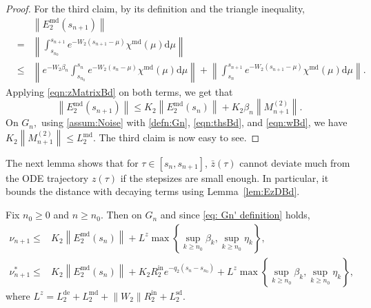 \documentclass[usenames,dvipsnames,final,12pt]{colt2018} %
\newcommand{\Ww}{W_2}
\newcommand{\Mw}{M^{(2)}}
\newcommand{\sw}{\beta}
\newcommand{\lz}{q_2}
\newcommand{\Rzi}{R_2^{\textrm{in}}}
\newcommand{\rz}{\nu}
\newcommand{\rzS}{\nu^{*}}
\newcommand{\chizM}{\chi^{\md}}
\newcommand{\barz}{\bar{z}}
\newcommand{\Ez}{E_2}
\newcommand{\Lz}{L^z}
\newcommand{\LzD}{L_2^{\dt}}
\newcommand{\LzM}{L_2^{\md}}
\newcommand{\LzS}{L_2^{\sd}}
\newcommand{\Kz}{K_2}
\newcommand{\EzM}{\Ez^{\md}}
\newcommand{\dt}{\text{de}}
\newcommand{\md}{\text{md}}
\newcommand{\sd}{\text{sd}}
\newcommand{\df}{\mathrm{d}}
\newcommand{\sI}[1]{s_{#1}}
\newcommand{\norm}[1]{\left\lVert#1\right\rVert}
\newcommand{\gal}[1]{#1}
\begin{document}
\begin{proof}
For the third claim, by its definition and the triangle inequality,
%
\begin{eqnarray*}
& & \norm{\EzM(\sI{n + 1})}\\
& = &  \norm{\int_{s_{n_0} }^{\sI{n + 1}} e^{-\Ww (\sI{n + 1} - \mu)} \chizM(\mu)\df \mu}\\
& \leq & \norm{e^{-\Ww \beta_n} \int_{ s_{n_0}}^{\sI{n}} e^{-\Ww (\sI{n} - \mu)} \chizM(\mu)\df \mu} + \norm{\int_{\sI{n}}^{\sI{n + 1}} e^{-\Ww (\sI{n + 1} - \mu)} \chizM(\mu)\df \mu}.
\end{eqnarray*}
%
Applying \eqref{eqn:zMatrixBd} on both terms, we get that
%
\[
\norm{\EzM(\sI{n + 1})} \leq \Kz \norm{\EzM(\sI{n})} + \Kz \sw_n \norm{\Mw_{n + 1}}.
\]
%
On $G_n,$ using \ref{assum:Noise} with \eqref{defn:Gn}, \eqref{eqn:thsBd}, and \eqref{eqn:wBd}, we have $\Kz\norm{\Mw_{n + 1}} \leq \LzM.$ The third claim is now easy to see.
\end{proof}

The \gal{next} lemma shows that for $\tau \in [s_n,s_{n+1}]$, $\barz(\tau)$  cannot deviate much from the ODE trajectory $z(\tau)$ if the stepsizes are small enough. In particular, it bounds the distance with decaying terms using Lemma~\ref{lem:EzDBd}.


\begin{lemma}
\label{lem:rzBd}
Fix $n_0 \geq 0$ and $n \geq n_0.$ Then on $G_n$ \gal{and since \eqref{eq: Gn' definition} holds},
%
\begin{align*}
\rz_{n + 1} \leq &\Kz \norm{\EzM(\sI{n})} + \Lz \max \left\{\sup_{k \geq n_0} \beta_k, \sup_{k \geq n_0} \eta_k \right\}, \\
\rzS_{n + 1}  \leq & \Kz \norm{\EzM(\sI{n})} + \Kz \Rzi e^{-\lz(\sI{n} - \sI{n_0})} + \Lz \max \left\{\sup_{k \geq n_0} \beta_k, \sup_{k \geq n_0} \eta_k \right\},
\end{align*}
%
where $\Lz = \LzD + \LzM + \norm{\Ww} \Rzi +  \LzS.$
\end{lemma}
\end{document}
